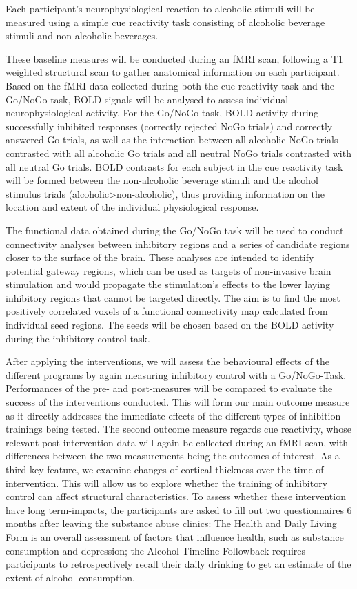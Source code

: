 \documentclass[12pt]{article}
\begin{document}
Each participant's neurophysiological reaction to alcoholic stimuli will be measured using a simple cue reactivity task consisting of alcoholic beverage stimuli and non-alcoholic beverages. 

These baseline measures will be conducted during an fMRI scan, following a T1 weighted structural scan to gather anatomical information on each participant. Based on the fMRI data collected during both the cue reactivity task and the Go/NoGo task, BOLD signals will be analysed to assess individual neurophysiological activity. For the Go/NoGo task, BOLD activity during successfully inhibited responses (correctly rejected NoGo trials) and correctly answered Go trials, as well as the interaction between all alcoholic NoGo trials contrasted with all alcoholic Go trials and all neutral NoGo trials contrasted with all neutral Go trials. BOLD contrasts for each subject in the cue reactivity task will be formed between the non-alcoholic beverage stimuli and the alcohol stimulus trials (alcoholic>non-alcoholic), thus providing information on the location and extent of the individual physiological response.

The functional data obtained during the Go/NoGo task will be used to conduct connectivity analyses between inhibitory regions and a series of candidate regions closer to the surface of the brain. These analyses are intended to identify potential gateway regions, which can be used as targets of non-invasive brain stimulation and would propagate the stimulation's effects to the lower laying inhibitory regions that cannot be targeted directly. The aim is to find the most positively correlated voxels of a functional connectivity map calculated from individual seed regions. The seeds will be chosen based on the BOLD activity during the inhibitory control task.

After applying the interventions, we will assess the behavioural effects of the different programs by again measuring inhibitory control with a Go/NoGo-Task. Performances of the pre- and post-measures will be compared to evaluate the success of the interventions conducted. This will form our main outcome measure as it directly addresses the immediate effects of the different types of inhibition trainings being tested.
The second outcome measure regards cue reactivity, whose relevant post-intervention data will again be collected during an fMRI scan, with differences between the two measurements being the outcomes of interest.
As a third key feature, we examine changes of cortical thickness over the time of intervention. This will allow us to explore whether the training of inhibitory control can affect structural characteristics.
To assess whether these intervention have long term-impacts, the participants are asked to fill out two questionnaires 6 months after leaving the substance abuse clinics: The Health and Daily Living Form \parencite{moosHealthDailyLiving1986} is an overall assessment of factors that influence health, such as substance consumption and depression; the Alcohol Timeline Followback \parencite{sobellAlcoholTimelineFollowback1995} requires participants to retrospectively recall their daily drinking to get an estimate of the extent of alcohol consumption.
\end{document}
